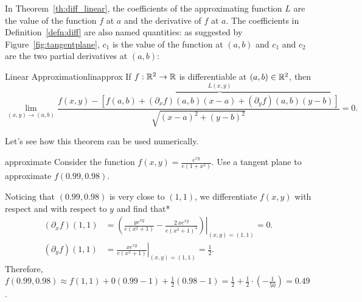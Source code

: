 \documentclass[svgnames]{report}
\begin{document}
  In Theorem~\ref{th:diff_linear}, the coefficients of the
  approximating function $L$ are the value of the function $f$ at $a$
  and the derivative of $f$ at $a$. The coefficients in
  Definition~\ref{defn:diff} are also named quantities: as suggested
  by Figure~\ref{fig:tangentplane}, $c_1$ is the value of the function
  at $(a,b)$ and $c_1$ and $c_2$ are the two partial derivatives at
  $(a,b)$:

  \vspace{12pt} 

  \begin{theo}{Linear Approximation}{linapprox}
    If $f: \mathbb{R}^2 \to \mathbb{R}$ is differentiable at $(a,b) \in \mathbb{R}^2$, then
    \[
      \lim_{(x,y) \to (a,b)}\frac{f(x,y) - \overbrace{\left[f(a,b) + (\partial_x
        f)(a,b)(x-a) + (\partial_y
        f)(a,b)(y-b)\right]}^{L(x,y)}}{\sqrt{(x-a)^2 + (y-b)^2}} = 0.
    \]
  \end{theo}

  Let's see how this theorem can be used numerically. 

  \begin{example}{}{approximate}
    Consider the function $f(x,y) = \frac{e^{xy}}{e(1+x^2)}$. Use a
    tangent plane to approximate $f(0.99,0.98)$.
  \end{example}

  \begin{solution}
    Noticing that $(0.99,0.98)$ is very close to $(1,1)$, we
    differentiate $f(x,y)$ with respect and with respect to $y$ and
    find that* 
    \begin{align*}
      (\partial_x f)(1,1) &= \left.\left(
                            \frac{y e^{x y}}{e(x^{2} + 1)} -
                            \frac{2 \, x e^{xy}}{{e\left(x^{2} +
                            1\right)}^{2}}\right)\right|_{(x,y)
                            =(1,1)} = 0. \\
      (\partial_y f)(1,1) &=    \left.\frac{x e^{x y}}{e(x^{2} +
                            1)}\right|_{(x,y) = (1,1)} = \frac{1}{2}. 
    \end{align*}
    Therefore, $f(0.99,0.98) \approx f(1,1) + 0(0.99-1) +
    \frac{1}{2}(0.98-1) = \frac{1}{2} + \frac{1}{2} \cdot
    (-\frac{1}{50}) = 0.49$.  
  \end{solution}
  
\end{document}
